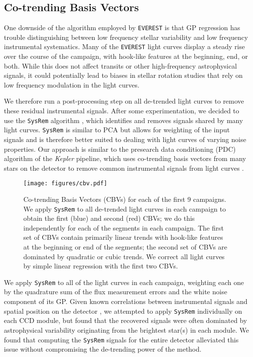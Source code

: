 \documentclass[]{emulateapj}
\begin{document}
\subsection{Co-trending Basis Vectors}
\label{sec:cbvs}
One downside of the algorithm employed by \texttt{EVEREST} is that GP regression has trouble
distinguishing between low frequency stellar variability and low frequency instrumental
systematics. Many of the \texttt{EVEREST} light curves display a steady rise over the
course of the campaign, with hook-like features at the beginning, end, or both. While this
does not affect transits or other high-frequency astrophysical signals, it could potentially
lead to biases in stellar rotation studies that rely on low frequency modulation in the
light curves.

We therefore run a post-processing step on all de-trended light curves to remove these
residual instrumental signals. After some experimentation, we decided to use the
\texttt{SysRem} algorithm \citep{Tamuz05}, which identifies and removes signals shared by many
light curves. \texttt{SysRem} is similar to PCA but allows for weighting of the input
signals and is therefore better suited to dealing with light curves of varying noise
properties. Our approach is similar to the presearch data conditioning (PDC) algorithm
of the \emph{Kepler} pipeline, which uses co-trending basis vectors from many stars
on the detector to remove common instrumental signals from light curves \citep{Stumpe12,Smith12}.

\begin{figure}[hbt]
  \begin{center}
      \texttt{[image: figures/cbv.pdf]}
      \caption{Co-trending Basis Vectors (CBVs) for each of the first 9 campaigns.
         We apply \texttt{SysRem} to all de-trended light curves
         in each campaign to obtain the first (blue) and second (red) CBVs; we do this
         independently for each of the segments in each campaign.
         The first set of CBVs contain primarily linear trends with hook-like
         features at the beginning or end of the segments; the second set of CBVs are
         dominated by quadratic or cubic trends. We correct all
         light curves by simple
         linear regression with the first two CBVs.}
     \label{fig:cbv}
  \end{center}
\end{figure}

We apply \texttt{SysRem} to all of the light curves in each campaign, weighting each one
by the quadrature sum of the flux measurement errors and the white noise component of its
GP. Given known correlations between instrumental signals and spatial position on the
detector \citep[e.g.,][]{Petigura12,Wang16}, we attempted to apply \texttt{SysRem} individually
on each CCD module, but found that the recovered signals were often dominated by
astrophysical variability originating from the brightest star(s) in each module.
We found that computing the \texttt{SysRem} signals for the entire detector alleviated
this issue without compromising the de-trending power of the method.
\end{document}
